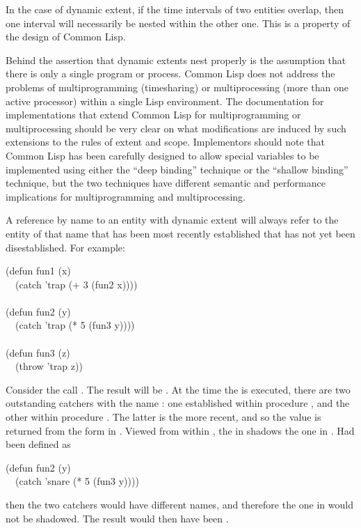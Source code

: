 In the case of dynamic extent, if the time intervals of two entities
overlap, then one interval will necessarily be nested within the
other one.  This is a property of the design of Common Lisp.

\beforenoterule
\begin{implementation}
Behind the assertion that dynamic extents nest properly
is the assumption that there is only a single program or process.
Common Lisp does not address the problems of multiprogramming
(timesharing) or
multiprocessing (more than one active processor)
within a single Lisp environment.  The documentation for
implementations that extend Common Lisp for multiprogramming or
multiprocessing should
be very clear on what modifications are induced by such extensions
to the rules of extent and scope.
Implementors should note that Common Lisp has been carefully designed
to allow special variables to be implemented using either
the ``deep binding'' technique or the ``shallow binding'' technique,
but the two techniques have different semantic
and performance implications for multiprogramming and multiprocessing.
\end{implementation}
\afternoterule

A reference by name to an entity with dynamic extent
will always refer to the entity of that name
that has been most recently established
that has not yet been disestablished.
For example:
\begin{lisp}
(defun fun1 (x) \\
~~(catch 'trap (+ 3 (fun2 x)))) \\
 \\
(defun fun2 (y) \\
~~(catch 'trap (* 5 (fun3 y)))) \\
 \\
(defun fun3 (z) \\
~~(throw 'trap z))
\end{lisp}
Consider the call .  The result will be .  At the time
the  is executed, there are two outstanding catchers with the
name : one established within procedure , and the other
within procedure .  The latter is the more recent, and so the
value  is returned from the  form in .
Viewed from within , the  in  shadows the one in .
Had 
been defined as
\begin{lisp}
(defun fun2 (y) \\
~~(catch 'snare (* 5 (fun3 y))))
\end{lisp}
then the two catchers would have different names, and therefore the one
in  would not be shadowed.  The result would then have been .

